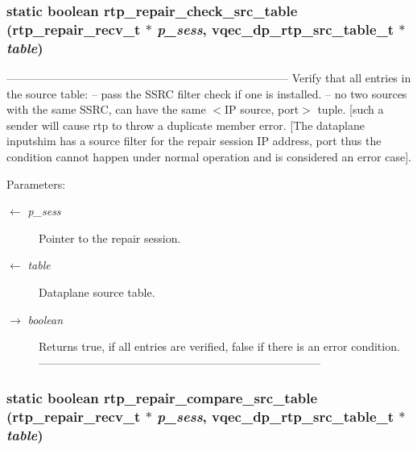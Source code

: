 \subsubsection{\setlength{\rightskip}{0pt plus 5cm}static boolean rtp\_\-repair\_\-check\_\-src\_\-table (\bf{rtp\_\-repair\_\-recv\_\-t} $\ast$ {\em p\_\-sess}, vqec\_\-dp\_\-rtp\_\-src\_\-table\_\-t $\ast$ {\em table})\hspace{0.3cm}{\tt  [static]}}\label{rtp__repair__recv_8c_768db6efb86f519c8a17f51fd4f0296e}


--------------------------------------------------------------------------- Verify that all entries in the source table: -- pass the SSRC filter check if one is installed. -- no two sources with the same SSRC, can have the same $<$IP source, port$>$ tuple. [such a sender will cause rtp to throw a duplicate member error. [The dataplane inputshim has a source filter for the repair session IP address, port thus the condition cannot happen under normal operation and is considered an error case].

\begin{Desc}
\item[Parameters:]
\begin{description}
\item[\mbox{$\leftarrow$} {\em p\_\-sess}]Pointer to the repair session. \item[\mbox{$\leftarrow$} {\em table}]Dataplane source table. \item[\mbox{$\rightarrow$} {\em boolean}]Returns true, if all entries are verified, false if there is an error condition. --------------------------------------------------------------------------- \end{description}
\end{Desc}
\subsubsection{\setlength{\rightskip}{0pt plus 5cm}static boolean rtp\_\-repair\_\-compare\_\-src\_\-table (\bf{rtp\_\-repair\_\-recv\_\-t} $\ast$ {\em p\_\-sess}, vqec\_\-dp\_\-rtp\_\-src\_\-table\_\-t $\ast$ {\em table})\hspace{0.3cm}{\tt  [static]}}\label{rtp__repair__recv_8c_98c2b34d128f3323acb6de301e768561}


